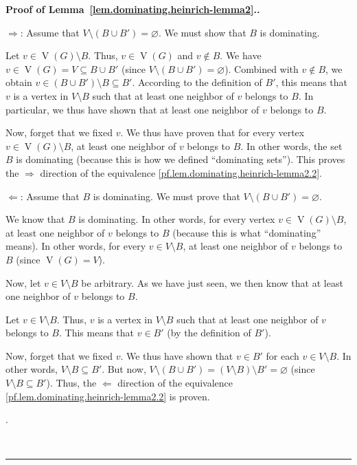 \documentclass[numbers=enddot,12pt,final,onecolumn,notitlepage]{scrartcl}%
\theoremstyle{definition}
\newenvironment{proof}[1][Proof]{\noindent\textbf{#1.} }{\ \rule{0.5em}{0.5em}}
\newcommand{\tup}[1]{\left( #1 \right)}
\newcommand{\verts}[1]{\operatorname{V}\left( #1 \right)}
\begin{document}
\begin{proof}[Proof of Lemma~\ref{lem.dominating.heinrich-lemma2}.]
{$\Longrightarrow$: Assume that
$V \setminus \tup{B \cup B'} = \varnothing$. We must show that $B$
is dominating.

Let $v \in \verts{G} \setminus B$. Thus, $v \in \verts{G}$ and
$v \notin B$. We have $v \in \verts{G} = V \subseteq B \cup B'$
(since $V \setminus \tup{B \cup B'} = \varnothing$). Combined with
$v \notin B$, we obtain $v \in \tup{B \cup B'} \setminus B \subseteq
B'$. According to the definition of $B'$, this means that $v$ is a
vertex in $V \setminus B$ such that at least one neighbor of
$v$ belongs to $B$. In particular, we thus have shown that at least
one neighbor of $v$ belongs to $B$.

Now, forget that we fixed $v$. We thus have proven that for
every vertex $v \in \verts{G} \setminus B$, at least one neighbor of
$v$ belongs to $B$. In other words, the set $B$ is dominating
(because this is how we defined ``dominating sets''). This proves
the $\Longrightarrow$ direction of the equivalence
\eqref{pf.lem.dominating.heinrich-lemma2.2}.

$\Longleftarrow$: Assume that $B$ is dominating. We must prove that
$V \setminus \tup{B \cup B'} = \varnothing$.

We know that $B$ is dominating. In other words, for every vertex
$v \in \verts{G} \setminus B$, at least one neighbor of $v$ belongs to
$B$ (because this is what ``dominating'' means). In other words, for
every $v \in V \setminus B$, at least one neighbor of $v$ belongs to
$B$ (since $\verts{G} = V$).

Now, let $v \in V \setminus B$ be arbitrary. As we have just seen,
we then know that at least one neighbor of $v$ belongs to $B$.

Let $v \in V \setminus B$. Thus, $v$ is a
vertex in $V \setminus B$ such that at least one neighbor of
$v$ belongs to $B$. This means that $v \in B'$ (by the definition of
$B'$).

Now, forget that we fixed $v$. We thus have shown that $v \in B'$ for
each $v \in V \setminus B$. In other words,
$V \setminus B \subseteq B'$. But now,
$ V \setminus \tup{B \cup B'} = \tup{V \setminus B} \setminus B'
= \varnothing$
(since $V \setminus B \subseteq B'$).
Thus, the $\Longleftarrow$ direction of the equivalence
\eqref{pf.lem.dominating.heinrich-lemma2.2} is proven.}.


\end{proof}
\end{document}
